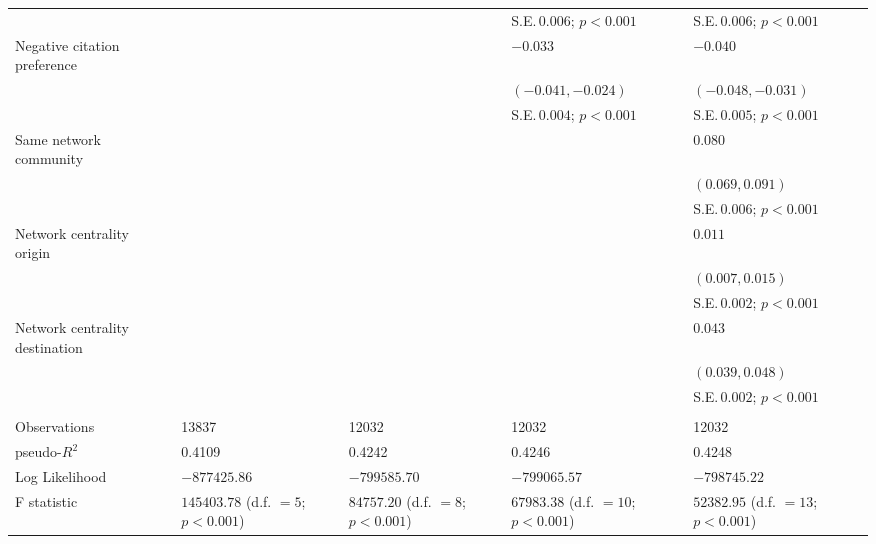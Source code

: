 \begin{table}[H]
\begin{adjustbox}{max width=\textwidth}
\begin{tabular}{lllll}
 &  &  & S.E.\,$0.006$; ${p < 0.001}$ & S.E.\,$0.006$; ${p < 0.001}$\\ [0.8ex]  
Negative citation preference &  &  & $-0.033$ & $-0.040$\\ 
 &  &  & $(-0.041, -0.024)$ & $(-0.048, -0.031)$\\ 
 &  &  & S.E.\,$0.004$; ${p < 0.001}$ & S.E.\,$0.005$; ${p < 0.001}$\\ [0.8ex]  
Same network community &  &  &  & $0.080$\\ 
 &  &  &  & $(0.069, 0.091)$\\ 
 &  &  &  & S.E.\,$0.006$; ${p < 0.001}$\\ [0.8ex]  
Network centrality origin &  &  &  & $0.011$\\ 
 &  &  &  & $(0.007, 0.015)$\\ 
 &  &  &  & S.E.\,$0.002$; ${p < 0.001}$\\ [0.8ex]  
Network centrality destination &  &  &  & $0.043$\\ 
 &  &  &  & $(0.039, 0.048)$\\ 
 &  &  &  & S.E.\,$0.002$; ${p < 0.001}$\\ [0.8ex]  
\hline 
\hline \\[-1.8ex] 
Observations & 13837 & 12032 & 12032 & 12032 \\ 
pseudo-$R^2$ & 0.4109 & 0.4242 & 0.4246 & 0.4248 \\ 
Log Likelihood & $-877425.86$ & $-799585.70$ & $-799065.57$ & $-798745.22$ \\ 
F statistic & $145403.78$ (d.f. $= 5$; ${p < 0.001}$) & $84757.20$ (d.f. $= 8$; ${p < 0.001}$) & $67983.38$ (d.f. $= 10$; ${p < 0.001}$) & $52382.95$ (d.f. $= 13$; ${p < 0.001}$) \\ 
\hline 
\end{tabular}
\end{adjustbox}
\end{table}

